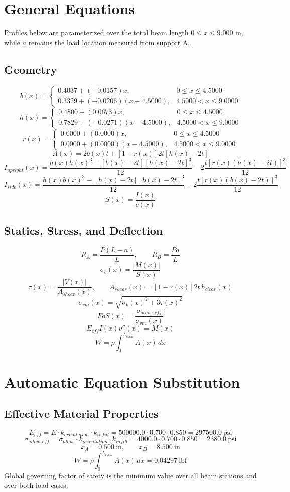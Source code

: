 \documentclass[11pt]{article}
\begin{document}
\section*{General Equations}
Profiles below are parameterized over the total beam length $0 \le x \le 9.000$ in, while $a$ remains the load location measured from support A.
\subsection*{Geometry}
\[
b(x)=\begin{cases}0.4037 + (-0.0157)x, & 0 \le x \le 4.5000\\0.3329 + (-0.0206)(x-4.5000), & 4.5000 < x \le 9.0000\end{cases}
\]
\[
h(x)=\begin{cases}0.4800 + (0.0673)x, & 0 \le x \le 4.5000\\0.7829 + (-0.0271)(x-4.5000), & 4.5000 < x \le 9.0000\end{cases}
\]
\[
r(x)=\begin{cases}0.0000 + (0.0000)x, & 0 \le x \le 4.5000\\0.0000 + (0.0000)(x-4.5000), & 4.5000 < x \le 9.0000\end{cases}
\]
\[
A(x)=2b(x)t+[1-r(x)]2t[h(x)-2t]
\]
\[
I_{upright}(x)=\frac{b(x)h(x)^3-[b(x)-2t][h(x)-2t]^3}{12}-2\frac{t[r(x)(h(x)-2t)]^3}{12}
\]
\[
I_{side}(x)=\frac{h(x)b(x)^3-[h(x)-2t][b(x)-2t]^3}{12}-2\frac{t[r(x)(b(x)-2t)]^3}{12}
\]
\[
S(x)=\frac{I(x)}{c(x)}
\]

\subsection*{Statics, Stress, and Deflection}
\[
R_A=\frac{P(L-a)}{L}, \qquad R_B=\frac{Pa}{L}
\]
\[
\sigma_b(x)=\frac{|M(x)|}{S(x)}
\]
\[
\tau(x)=\frac{|V(x)|}{A_{shear}(x)}, \qquad A_{shear}(x)=[1-r(x)]2t\,h_{clear}(x)
\]
\[
\sigma_{vm}(x)=\sqrt{\sigma_b(x)^2+3\tau(x)^2}
\]
\[
FoS(x)=\frac{\sigma_{allow,eff}}{\sigma_{vm}(x)}
\]
\[
E_{eff}I(x)v''(x)=M(x)
\]
\[
W=\rho\int_0^{L_{total}} A(x)\,dx
\]

\section*{Automatic Equation Substitution}
\subsection*{Effective Material Properties}
\[E_{eff} = E \cdot k_{orientation} \cdot k_{infill} = 500000.0 \cdot 0.700 \cdot 0.850 = 297500.0\ \mathrm{psi}\]
\[\sigma_{allow,eff} = \sigma_{allow} \cdot k_{orientation} \cdot k_{infill} = 4000.0 \cdot 0.700 \cdot 0.850 = 2380.0\ \mathrm{psi}\]
\[x_A = 0.500\ \mathrm{in}, \qquad x_B = 8.500\ \mathrm{in}\]
\[W = \rho \int_0^{L_{total}} A(x)\,dx = 0.04297\ \mathrm{lbf}\]
Global governing factor of safety is the minimum value over all beam stations and over both load cases.
\end{document}
